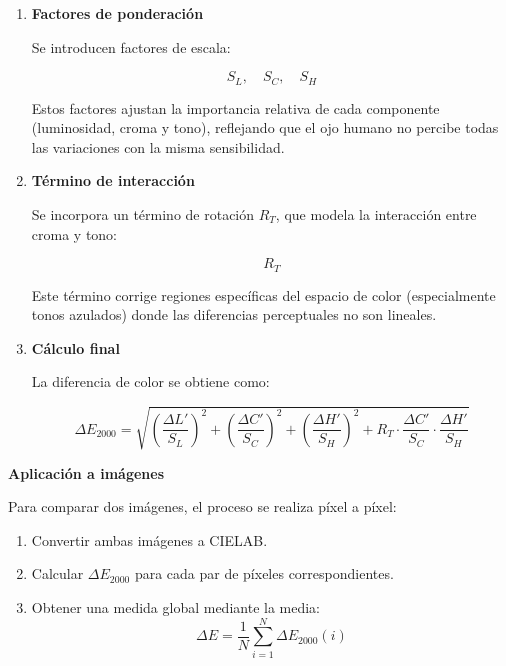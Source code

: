 \documentclass[a4paper]{article}
\begin{document}
\begin{enumerate}
	\item \textbf{Factores de ponderación}
	
	Se introducen factores de escala:
	
	\begin{equation}
		S_L, \quad S_C, \quad S_H
	\end{equation}
	
	Estos factores ajustan la importancia relativa de cada componente (luminosidad, croma y tono), reflejando que el ojo humano no percibe todas las variaciones con la misma sensibilidad.
	
	\item \textbf{Término de interacción}
	
	Se incorpora un término de rotación $R_T$, que modela la interacción entre croma y tono:
	
	\begin{equation}
		R_T
	\end{equation}
	
	Este término corrige regiones específicas del espacio de color (especialmente tonos azulados) donde las diferencias perceptuales no son lineales.
	
	\item \textbf{Cálculo final}
	
	La diferencia de color se obtiene como:
	
	\begin{equation}
		\Delta E_{2000} =
		\sqrt{
			\left(\frac{\Delta L'}{S_L}\right)^2 +
			\left(\frac{\Delta C'}{S_C}\right)^2 +
			\left(\frac{\Delta H'}{S_H}\right)^2 +
			R_T \cdot \frac{\Delta C'}{S_C} \cdot \frac{\Delta H'}{S_H}
		}
	\end{equation}
	
\end{enumerate}

\medskip
\textbf{Aplicación a imágenes}

Para comparar dos imágenes, el proceso se realiza píxel a píxel:

\begin{enumerate}
	\item Convertir ambas imágenes a CIELAB.
	\item Calcular $\Delta E_{2000}$ para cada par de píxeles correspondientes.
	\item Obtener una medida global mediante la media:
	\begin{equation}
		\Delta E = \frac{1}{N} \sum_{i=1}^{N} \Delta E_{2000}(i)
	\end{equation}
\end{enumerate}
\end{document}
